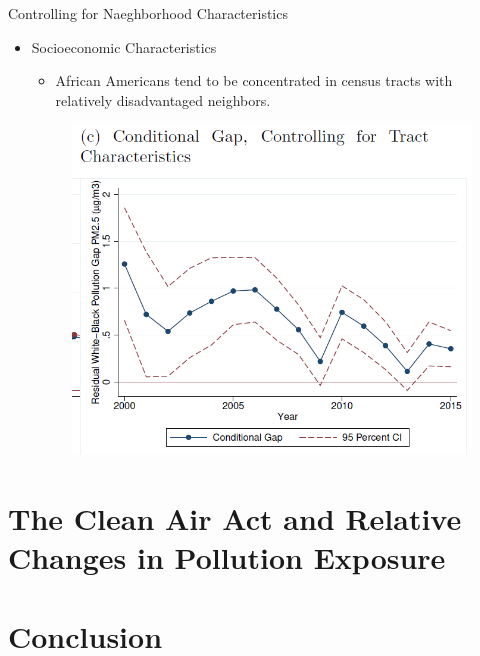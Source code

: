 \documentclass[dvipdfmx,12pt]{beamer}
\begin{document}
\begin{frame}{Controlling for Naeghborhood Characteristics}
  \begin{itemize}
    \item Socioeconomic Characteristics
    \begin{itemize}
      \item African Americans tend to be concentrated in census tracts with relatively disadvantaged neighbors.
    \end{itemize}
    \begin{figure}
      \centering
      \includegraphics[scale = .45]{F3C.png}
    \end{figure}
  \end{itemize}
\end{frame}

\section{The Clean Air Act and Relative Changes in Pollution Exposure}
\frame{\sectionpage}
\begin{frame}{}
  
\end{frame}

\section{Conclusion}
\frame{\sectionpage}
\begin{frame}{}
  
\end{frame}
\end{document}
